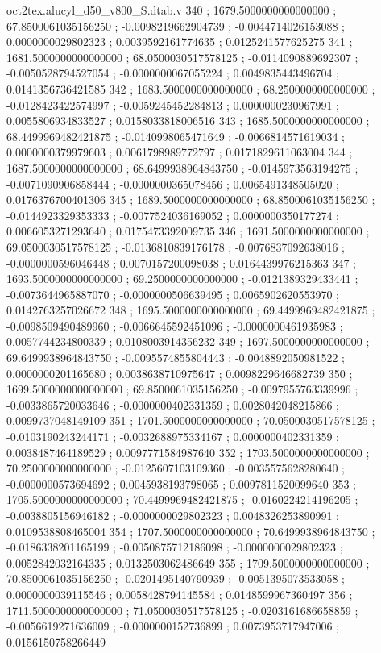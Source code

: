 \begin{filecontents}[overwrite]{oct2tex.alucyl_d50_v800_S.dtab.v}
340 ; 1679.5000000000000000 ; 67.8500061035156250 ; -0.0098219662904739 ; -0.0044714026153088 ; 0.0000000029802323 ; 0.0039592161774635 ; 0.0125241577625275
341 ; 1681.5000000000000000 ; 68.0500030517578125 ; -0.0114090889692307 ; -0.0050528794527054 ; -0.0000000067055224 ; 0.0049835443496704 ; 0.0141356736421585
342 ; 1683.5000000000000000 ; 68.2500000000000000 ; -0.0128423422574997 ; -0.0059245452284813 ; 0.0000000230967991 ; 0.0055806934833527 ; 0.0158033818006516
343 ; 1685.5000000000000000 ; 68.4499969482421875 ; -0.0140998065471649 ; -0.0066814571619034 ; 0.0000000379979603 ; 0.0061798989772797 ; 0.0171829611063004
344 ; 1687.5000000000000000 ; 68.6499938964843750 ; -0.0145973563194275 ; -0.0071090906858444 ; -0.0000000365078456 ; 0.0065491348505020 ; 0.0176376700401306
345 ; 1689.5000000000000000 ; 68.8500061035156250 ; -0.0144923329353333 ; -0.0077524036169052 ; 0.0000000350177274 ; 0.0066053271293640 ; 0.0175473392009735
346 ; 1691.5000000000000000 ; 69.0500030517578125 ; -0.0136810839176178 ; -0.0076837092638016 ; -0.0000000596046448 ; 0.0070157200098038 ; 0.0164439976215363
347 ; 1693.5000000000000000 ; 69.2500000000000000 ; -0.0121389329433441 ; -0.0073644965887070 ; -0.0000000506639495 ; 0.0065902620553970 ; 0.0142763257026672
348 ; 1695.5000000000000000 ; 69.4499969482421875 ; -0.0098509490489960 ; -0.0066645592451096 ; -0.0000000461935983 ; 0.0057744234800339 ; 0.0108003914356232
349 ; 1697.5000000000000000 ; 69.6499938964843750 ; -0.0095574855804443 ; -0.0048892050981522 ; 0.0000000201165680 ; 0.0038638710975647 ; 0.0098229646682739
350 ; 1699.5000000000000000 ; 69.8500061035156250 ; -0.0097955763339996 ; -0.0033865720033646 ; -0.0000000402331359 ; 0.0028042048215866 ; 0.0099737048149109
351 ; 1701.5000000000000000 ; 70.0500030517578125 ; -0.0103190243244171 ; -0.0032688975334167 ; 0.0000000402331359 ; 0.0038487464189529 ; 0.0097771584987640
352 ; 1703.5000000000000000 ; 70.2500000000000000 ; -0.0125607103109360 ; -0.0035575628280640 ; -0.0000000573694692 ; 0.0045938193798065 ; 0.0097811520099640
353 ; 1705.5000000000000000 ; 70.4499969482421875 ; -0.0160224214196205 ; -0.0038805156946182 ; -0.0000000029802323 ; 0.0048326253890991 ; 0.0109538808465004
354 ; 1707.5000000000000000 ; 70.6499938964843750 ; -0.0186338201165199 ; -0.0050875712186098 ; -0.0000000029802323 ; 0.0052842032164335 ; 0.0132503062486649
355 ; 1709.5000000000000000 ; 70.8500061035156250 ; -0.0201495140790939 ; -0.0051395073533058 ; 0.0000000039115546 ; 0.0058428794145584 ; 0.0148599967360497
356 ; 1711.5000000000000000 ; 71.0500030517578125 ; -0.0203161686658859 ; -0.0056619271636009 ; -0.0000000152736899 ; 0.0073953717947006 ; 0.0156150758266449

\end{filecontents}
